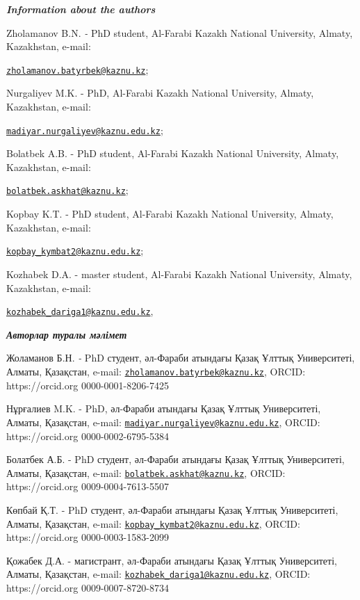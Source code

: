 \begin{authorinfo}
\emph{{\bfseries Information about the authors}}

Zholamanov B.N. \emph{-} PhD student, Al-Farabi Kazakh National
University, Almaty, Kazakhstan, e-mail:

\href{mailto:zholamanov.batyrbek@kaznu.kz}{\nolinkurl{zholamanov.batyrbek@kaznu.kz}};

Nurgaliyev M.K. - PhD, Al-Farabi Kazakh National University, Almaty,
Kazakhstan, e-mail:

\href{mailto:madiyar.nurgaliyev@kaznu.edu.kz}{\nolinkurl{madiyar.nurgaliyev@kaznu.edu.kz}};

Bolatbek A.B. - PhD student, Al-Farabi Kazakh National University,
Almaty, Kazakhstan, e-mail:

\href{mailto:bolatbek.askhat@kaznu.kz}{\nolinkurl{bolatbek.askhat@kaznu.kz}};

Kopbay K.T. - PhD student, Al-Farabi Kazakh National University, Almaty,
Kazakhstan, e-mail:

\href{mailto:kopbay\_kymbat2@kaznu.edu.kz}{\nolinkurl{kopbay\_kymbat2@kaznu.edu.kz}};

Kozhabek D.A. - master student, Al-Farabi Kazakh National University,
Almaty, Kazakhstan, e-mail:

\href{mailto:kozhabek\_dariga1@kaznu.edu.kz}{\nolinkurl{kozhabek\_dariga1@kaznu.edu.kz}},

\emph{{\bfseries Авторлар туралы мәлімет}}

Жоламанов Б.Н. \emph{-} PhD студент, әл-Фараби атындағы Қазақ Ұлттық
Университеті, Алматы, Қазақстан, e-mail:
\href{mailto:zholamanov.batyrbek@kaznu.kz}{\nolinkurl{zholamanov.batyrbek@kaznu.kz}},
ORCID: https://orcid.org 0000-0001-8206-7425

Нұрғалиев M.K. - PhD, әл-Фараби атындағы Қазақ Ұлттық Университеті,
Алматы, Қазақстан, e-mail:
\href{mailto:madiyar.nurgaliyev@kaznu.edu.kz}{\nolinkurl{madiyar.nurgaliyev@kaznu.edu.kz}},
ORCID: https://orcid.org 0000-0002-6795-5384

Болатбек А.Б. - PhD студент, әл-Фараби атындағы Қазақ Ұлттық
Университеті, Алматы, Қазақстан, e-mail:
\href{mailto:bolatbek.askhat@kaznu.kz}{\nolinkurl{bolatbek.askhat@kaznu.kz}},
ORCID: https://orcid.org 0009-0004-7613-5507

Көпбай Қ.Т. - PhD студент, әл-Фараби атындағы Қазақ Ұлттық Университеті,
Алматы, Қазақстан, e-mail:
\href{mailto:kopbay\_kymbat2@kaznu.edu.kz}{\nolinkurl{kopbay\_kymbat2@kaznu.edu.kz}},
ORCID: https://orcid.org 0000-0003-1583-2099

Қожабек Д.А. - магистрант, әл-Фараби атындағы Қазақ Ұлттық Университеті,
Алматы, Қазақстан, e-mail:
\href{mailto:kozhabek\_dariga1@kaznu.edu.kz}{\nolinkurl{kozhabek\_dariga1@kaznu.edu.kz}},
ORCID: https://orcid.org 0009-0007-8720-8734\
\end{authorinfo}
